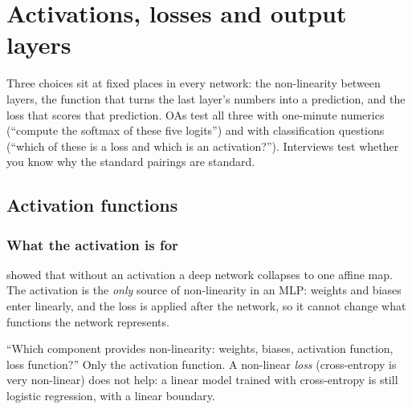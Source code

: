 \chapter{Activations, losses and output layers}
\label{ch:activations}

Three choices sit at fixed places in every network: the non-linearity between
layers, the function that turns the last layer's numbers into a prediction, and
the loss that scores that prediction. OAs test all three with one-minute numerics
(``compute the softmax of these five logits'') and with classification questions
(``which of these is a loss and which is an activation?''). Interviews test whether
you know why the standard pairings are standard.

\section{Activation functions}

\subsection{What the activation is for}
 showed that without an activation a deep network collapses to
one affine map. The activation is the \emph{only} source of non-linearity in an
MLP: weights and biases enter linearly, and the loss is applied after the network,
so it cannot change what functions the network represents.

\begin{remark}
	\trap ``Which component provides non-linearity: weights, biases, activation
	function, loss function?'' Only the activation function. A non-linear
	\emph{loss} (cross-entropy is very non-linear) does not help: a linear model
	trained with cross-entropy is still logistic regression, with a linear boundary.
\end{remark}

